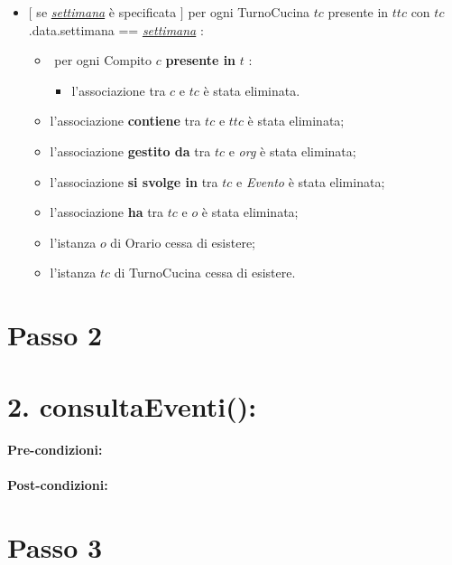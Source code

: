 \begin{itemize}
   \item $[$ se \underline{\textit{settimana}} è specificata $]$ \textlangle per ogni TurnoCucina $tc$ presente in $ttc$ con $tc$.data.settimana == \underline{\textit{settimana}} \textrangle:
\begin{itemize}
   \item \textlangle $ $ per ogni Compito $c$ \textbf{presente in} $t$ \textrangle:
    \begin{itemize}
        \item l'associazione tra $c$ e $tc$ è stata eliminata.
        \end{itemize}
    \item l'associazione \textbf{contiene} tra $tc$ e $ttc$ è stata eliminata;
    \item l'associazione \textbf{gestito da} tra $tc$ e \textit{org} è stata eliminata;
\item l'associazione \textbf{si svolge in} tra $tc$ e \textit{Evento} è stata eliminata;
    \item l'associazione \textbf{ha} tra $tc$ e $o$ è stata eliminata;
    \item l'istanza $o$ di Orario cessa di esistere;
    \item l'istanza $tc$ di TurnoCucina cessa di esistere.
\end{itemize}

\end{itemize}

\section{Passo 2}
\section*{2. consultaEventi():}

\paragraph{Pre-condizioni:}

\paragraph{Post-condizioni:}


\section{Passo 3}
